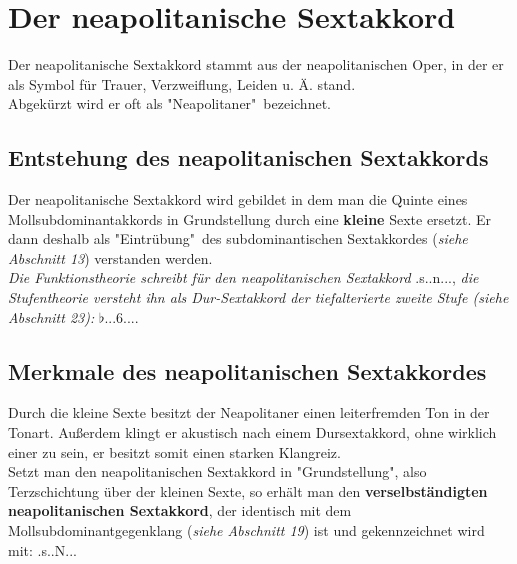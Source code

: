 \documentclass[a4paper]{article}
\newcommand{\dSS}[1]{\HH.\uppercase\expandafter{\romannumeral #1\relax}..6...} %
\newcommand{\Shochm}[2]{\HH.s.#2.#1...}
\begin{document}
	\section{Der neapolitanische Sextakkord}
	Der neapolitanische Sextakkord stammt aus der neapolitanischen Oper, in der er als Symbol für Trauer, Verzweiflung, Leiden u. Ä. stand.\\
	Abgekürzt wird er oft als "Neapolitaner"\ bezeichnet.
	
	\subsection{Entstehung des neapolitanischen Sextakkords}
	Der neapolitanische Sextakkord wird gebildet in dem man die Quinte eines Mollsubdominantakkords in Grundstellung durch eine \textbf{kleine} Sexte ersetzt. Er dann deshalb als "{}Eintrübung"\ des subdominantischen Sextakkordes (\textit{siehe Abschnitt 13}) verstanden werden.\\
	\textit{Die Funktionstheorie schreibt für den neapolitanischen Sextakkord} \Shochm{n}{}, \textit{die Stufentheorie versteht ihn als Dur-Sextakkord der tiefalterierte zweite Stufe (siehe Abschnitt 23):} $\flat$\dSS{2}.
	
	\subsection{Merkmale des neapolitanischen Sextakkordes}
	Durch die kleine Sexte besitzt der Neapolitaner einen leiterfremden Ton in der Tonart. Außerdem klingt er akustisch nach einem Dursextakkord, ohne wirklich einer zu sein, er besitzt somit einen starken Klangreiz.\\
	Setzt man den neapolitanischen Sextakkord in "Grundstellung", also Terzschichtung über der kleinen Sexte, so erhält man den \textbf{verselbständigten neapolitanischen Sextakkord}, der identisch mit dem Mollsubdominantgegenklang (\textit{siehe Abschnitt 19}) ist und gekennzeichnet wird mit: \Shochm{N}{}
	
\end{document}
